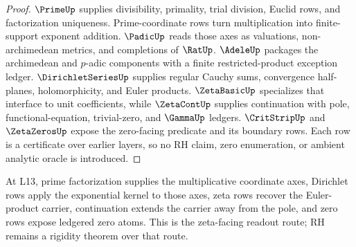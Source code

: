 \begin{proof}
$\PrimeUp$ supplies divisibility, primality, trial division, Euclid rows, and
factorization uniqueness.  Prime-coordinate rows turn multiplication into
finite-support exponent addition.  $\PadicUp$ reads those axes as valuations,
non-archimedean metrics, and completions of $\RatUp$.  $\AdeleUp$ packages the
archimedean and $p$-adic components with a finite restricted-product exception
ledger.  $\DirichletSeriesUp$ supplies regular Cauchy sums, convergence
half-planes, holomorphicity, and Euler products.  $\ZetaBasicUp$ specializes
that interface to unit coefficients, while $\ZetaContUp$ supplies continuation
with pole, functional-equation, trivial-zero, and $\GammaUp$ ledgers.
$\CritStripUp$ and $\ZetaZerosUp$ expose the zero-facing predicate and its
boundary rows.  Each row is a certificate over earlier layers, so no RH claim,
zero enumeration, or ambient analytic oracle is introduced.
\end{proof}

\begin{principle}
\label{prin:number-theory-spine-omega-zeta-readout}
At L13, prime factorization supplies the multiplicative coordinate axes,
Dirichlet rows apply the exponential kernel to those axes, zeta rows recover
the Euler-product carrier, continuation extends the carrier away from the
pole, and zero rows expose ledgered zero atoms.  This is the zeta-facing
readout route; RH remains a rigidity theorem over that route.
\end{principle}
